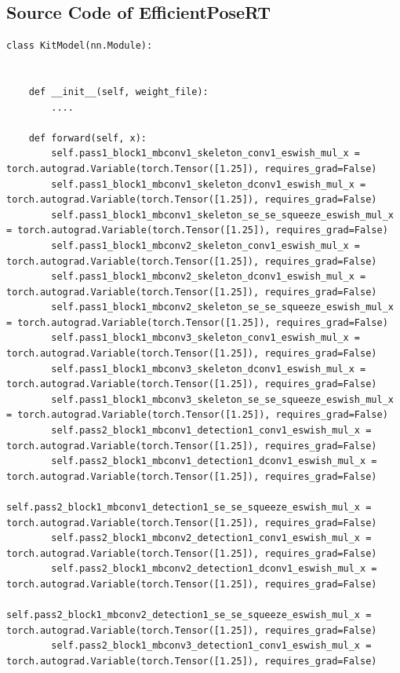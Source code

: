 \documentclass{fisatprojectfinal}
\begin{document}
\begin{appendices}
\section{Source Code of EfficientPoseRT}
	\begin{lstlisting}
class KitModel(nn.Module):

    
    def __init__(self, weight_file):
        ....

    def forward(self, x):
        self.pass1_block1_mbconv1_skeleton_conv1_eswish_mul_x = torch.autograd.Variable(torch.Tensor([1.25]), requires_grad=False)
        self.pass1_block1_mbconv1_skeleton_dconv1_eswish_mul_x = torch.autograd.Variable(torch.Tensor([1.25]), requires_grad=False)
        self.pass1_block1_mbconv1_skeleton_se_se_squeeze_eswish_mul_x = torch.autograd.Variable(torch.Tensor([1.25]), requires_grad=False)
        self.pass1_block1_mbconv2_skeleton_conv1_eswish_mul_x = torch.autograd.Variable(torch.Tensor([1.25]), requires_grad=False)
        self.pass1_block1_mbconv2_skeleton_dconv1_eswish_mul_x = torch.autograd.Variable(torch.Tensor([1.25]), requires_grad=False)
        self.pass1_block1_mbconv2_skeleton_se_se_squeeze_eswish_mul_x = torch.autograd.Variable(torch.Tensor([1.25]), requires_grad=False)
        self.pass1_block1_mbconv3_skeleton_conv1_eswish_mul_x = torch.autograd.Variable(torch.Tensor([1.25]), requires_grad=False)
        self.pass1_block1_mbconv3_skeleton_dconv1_eswish_mul_x = torch.autograd.Variable(torch.Tensor([1.25]), requires_grad=False)
        self.pass1_block1_mbconv3_skeleton_se_se_squeeze_eswish_mul_x = torch.autograd.Variable(torch.Tensor([1.25]), requires_grad=False)
        self.pass2_block1_mbconv1_detection1_conv1_eswish_mul_x = torch.autograd.Variable(torch.Tensor([1.25]), requires_grad=False)
        self.pass2_block1_mbconv1_detection1_dconv1_eswish_mul_x = torch.autograd.Variable(torch.Tensor([1.25]), requires_grad=False)
        self.pass2_block1_mbconv1_detection1_se_se_squeeze_eswish_mul_x = torch.autograd.Variable(torch.Tensor([1.25]), requires_grad=False)
        self.pass2_block1_mbconv2_detection1_conv1_eswish_mul_x = torch.autograd.Variable(torch.Tensor([1.25]), requires_grad=False)
        self.pass2_block1_mbconv2_detection1_dconv1_eswish_mul_x = torch.autograd.Variable(torch.Tensor([1.25]), requires_grad=False)
        self.pass2_block1_mbconv2_detection1_se_se_squeeze_eswish_mul_x = torch.autograd.Variable(torch.Tensor([1.25]), requires_grad=False)
        self.pass2_block1_mbconv3_detection1_conv1_eswish_mul_x = torch.autograd.Variable(torch.Tensor([1.25]), requires_grad=False)

\end{lstlisting}
\end{appendices}
\end{document}
